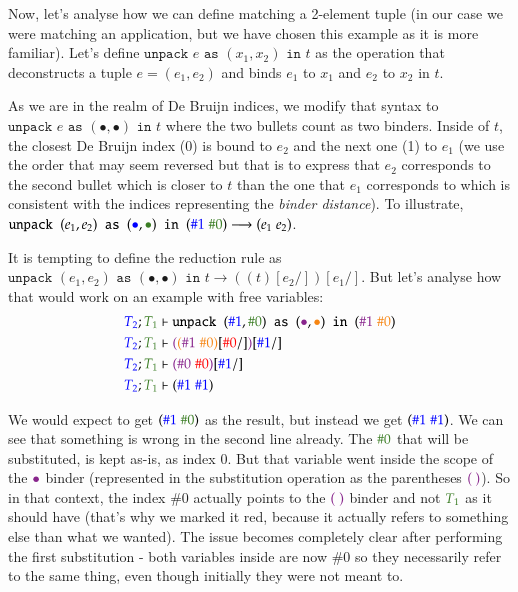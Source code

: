 \documentclass[runningheads]{article}
\begin{document}
Now, let's analyse how we can define matching a 2-element tuple (in our case we were matching an application, but we have chosen this example as it is more familiar). Let's define $\texttt{unpack } e \texttt{ as } (x_1, x_2) \texttt{ in } t$ as the operation that deconstructs a tuple $e = (e_1, e_2)$ and binds $e_1$ to $x_1$ and $e_2$ to $x_2$ in $t$.

As we are in the realm of De Bruijn indices, we modify that syntax to $\texttt{unpack } e \texttt{ as } (\bullet, \bullet) \texttt{ in } t$ where the two bullets count as two binders. Inside of $t$, the closest De Bruijn index (0) is bound to $e_2$ and the next one (1) to $e_1$ (we use the order that may seem reversed but that is to express that $e_2$ corresponds to the second bullet which is closer to $t$ than the one that $e_1$ corresponds to which is consistent with the indices representing the \textit{binder distance}). To illustrate, $\texttt{unpack } (e_1, e_2) \texttt{ as } ({\color{blue}\bullet}, {\color{OliveGreen}\bullet}) \texttt{ in } ({\color{blue}\#1} \; {\color{OliveGreen}\#0}) \longrightarrow (e_1 \; e_2)$.

It is tempting to define the reduction rule as $\texttt{unpack } (e_1, e_2) \texttt{ as } (\bullet, \bullet) \texttt{ in } t \longrightarrow ((t)[e_2/])[e_1/]$. But let's analyse how that would work on an example with free variables:
\begin{align*}
{\color{blue}T_2}; {\color{OliveGreen}T_1} &\vdash \texttt{unpack } ({\color{blue}\#1}, {\color{OliveGreen}\#0}) \texttt{ as } ({\color{Fuchsia}\bullet}, {\color{BurntOrange}\bullet}) \texttt{ in } ({\color{Fuchsia}\#1} \; {\color{BurntOrange}\#0}) \\
{\color{blue}T_2}; {\color{OliveGreen}T_1} &\vdash {\color{Fuchsia}(}{\color{BurntOrange}({\color{Fuchsia}\#1} \; {\color{BurntOrange}\#0})}[{\color{red}\#0}/]{\color{Fuchsia})}[{\color{blue}\#1}/] \\
{\color{blue}T_2}; {\color{OliveGreen}T_1} &\vdash {\color{Fuchsia}(}{\color{Fuchsia}\#0} \; {\color{red}\#0}{\color{Fuchsia})}[{\color{blue}\#1}/] \\
{\color{blue}T_2}; {\color{OliveGreen}T_1} &\vdash ({\color{blue}\#1} \; {\color{blue}\#1})
\end{align*}

We would expect to get $({\color{blue}\#1} \; {\color{OliveGreen}\#0})$ as the result, but instead we get $({\color{blue}\#1} \; {\color{blue}\#1})$. We can see that something is wrong in the second line already. The ${\color{OliveGreen}\#0}$ that will be substituted, is kept as-is, as index 0. But that variable went inside the scope of the ${\color{Fuchsia}\bullet}$ binder (represented in the substitution operation as the parentheses ${\color{Fuchsia}( \; )}$). So in that context, the index $\#0$ actually points to the ${\color{Fuchsia}( \; )}$ binder and not ${\color{OliveGreen}T_1}$ as it should have (that's why we marked it {\color{red}red}, because it actually refers to something else than what we wanted). The issue becomes completely clear after performing the first substitution - both variables inside are now $\#0$ so they necessarily refer to the same thing, even though initially they were not meant to.
\end{document}
